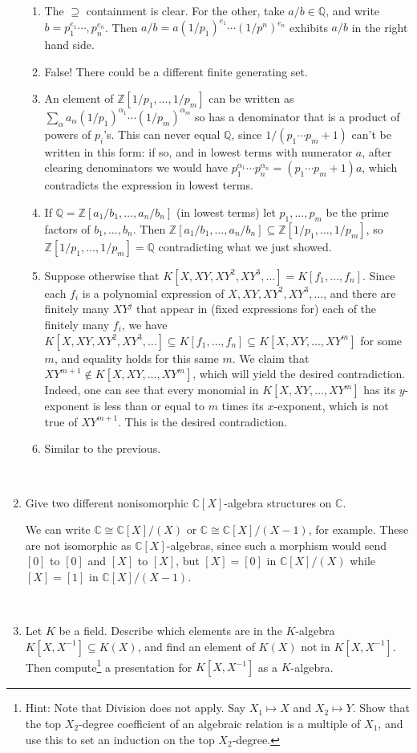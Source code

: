 \documentclass[12pt]{amsart}
\newcommand{\Bold}[1]{\contour{black}{#1}}
\newcommand{\Q}{\mathbb{Q}}
\newcommand{\Z}{\mathbb{Z}}
\newcommand{\C}{\mathbb{C}}
\newcommand{\solution}[1]{\ifthenelse {\equal{\displaysol}{1}} {\begin{framed}{\color{meretale}\noindent #1}\end{framed}} { \ }}
\newcommand\itemB{\stepcounter{enumi}\item[(\theenumi)]}
\newcommand\itema{\stepcounter{enumii}\item[{\Bold{(\theenumii)}}]}
\newcommand\itemb{\stepcounter{enumii}\item[(\theenumii)]}
\begin{document}
\begin{enumerate}
\solution{
\begin{enumerate}
\itema The $\supseteq$ containment is clear. For the other, take $a/b\in \Q$, and write $b=p_1^{e_1}\cdots,p_n^{e_n}$. Then $a/b=a(1/p_1)^{e_1}\cdots (1/p^n)^{e_n}$ exhibits $a/b$ in the right hand side.
\itema False! There could be a different finite generating set.
\itema An element of $\Z[1/p_1,\dots,1/p_m]$ can be written as $\sum_{\alpha} a_\alpha (1/p_1)^{\alpha_1} \cdots (1/p_m)^{\alpha_m}$ so has a denominator that is a product of powers of $p_i$'s. This can never equal $\Q$, since $1/(p_1 \cdots p_m +1)$ can't be written in this form: if so, and in lowest terms with numerator $a$, after clearing denominators we would have $p_1^{\alpha_1} \cdots p_n^{\alpha_n} = (p_1 \cdots p_m +1)a$, which contradicts the expression in lowest terms.
\itema If $\Q=\Z[a_1/b_1,\dots,a_n/b_n]$ (in lowest terms) let $p_1,\dots,p_m$ be the prime factors of $b_1,\dots,b_n$. Then $\Z[a_1/b_1,\dots,a_n/b_n] \subseteq \Z[1/p_1,\dots,1/p_m]$, so $\Z[1/p_1,\dots,1/p_m] = \Q$ contradicting what we just showed.
\itemb Suppose otherwise that $K[X,XY, XY^2, XY^3,\dots]=K[f_1,\dots,f_n]$. Since each $f_i$ is a polynomial expression of $X,XY, XY^2, XY^3,\dots$, and there are finitely many $XY^j$ that appear in (fixed expressions for) each of the finitely many $f_i$, we have $K[X,XY, XY^2, XY^3,\dots] \subseteq K[f_1,\dots,f_n]\subseteq K[X,XY,\dots,XY^m]$ for some $m$,  and equality holds for this same $m$. We claim that $XY^{m+1}\notin K[X,XY,\dots,XY^m]$, which will yield the desired contradiction. Indeed, one can see that every monomial in $K[X,XY,\dots,XY^m]$ has its $y$-exponent is less than or equal to $m$ times its $x$-exponent, which is not true of $XY^{m+1}$. This is the desired contradiction.
\itemb Similar to the previous.
\end{enumerate}
}

\itemB Give two different nonisomorphic $\C[X]$-algebra structures on $\C$.

\solution{We can write $\C\cong \C[X]/(X)$ or $\C \cong \C[X]/(X-1)$, for example. These are not isomorphic as $\C[X]$-algebras, since such a morphism would send $[0]$ to $[0]$ and $[X]$ to $[X]$, but $[X]=[0]$ in $\C[X]/(X)$ while $[X]=[1]$ in $\C[X]/(X-1)$.}


\itemB Let $K$ be a field. Describe which elements are in the $K$-algebra $K[X,X^{-1}]\subseteq K(X)$, and find an element of $K(X)$ not in $K[X,X^{-1}]$. Then compute\footnote{Hint: Note that Division does not apply. Say $X_1 \mapsto X$ and $X_2 \mapsto Y$. Show that the top $X_2$-degree coefficient of an algebraic relation is a multiple of $X_1$, and use this to set an induction on the top $X_2$-degree.} a presentation for $K[X,X^{-1}]$ as a $K$-algebra.


\end{enumerate}
\end{document}
